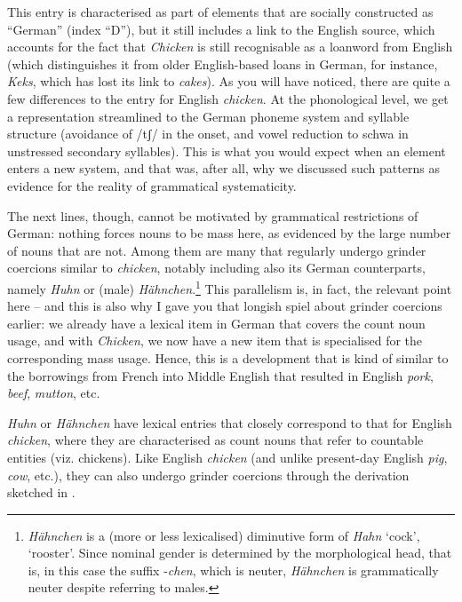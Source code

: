 This entry is characterised as part of elements that are socially constructed as “German” (index “D”), but it still includes a link to the English source, which accounts for the fact that \textit{Chicken} is still recognisable as a loanword from English (which distinguishes it from older English-based loans in German, for instance, \textit{Keks}, which has lost its link to \textit{cakes}). As you will have noticed, there are quite a few differences to the entry for English \textit{chicken}. At the phonological level, we get a representation streamlined to the German phoneme system and syllable structure (avoidance of /tʃ/ in the onset, and vowel reduction to schwa in unstressed secondary syllables). This is what you would expect when an element enters a new system, and that was, after all, why we discussed such patterns as evidence for the reality of grammatical systematicity.

The next lines, though, cannot be motivated by grammatical restrictions of German: nothing forces nouns to be mass here, as evidenced by the large number of nouns that are not. Among them are many that regularly undergo grinder coercions similar to \textit{chicken}, notably including also its German counterparts, namely \textit{Huhn} or (male) \textit{Hähnchen}.\footnote{\textit{Hähnchen} is a (more or less lexicalised) diminutive form of \textit{Hahn} ‘cock’, ‘rooster’. Since nominal gender is determined by the morphological head, that is, in this case the suffix -\textit{chen}, which is neuter, \textit{Hähnchen} is grammatically neuter despite referring to males.} This parallelism is, in fact, the relevant point here – and this is also why I gave you that longish spiel about grinder coercions earlier: we already have a lexical item in German that covers the count noun usage, and with \textit{Chicken}, we now have a new item that is specialised for the corresponding mass usage. Hence, this is a development that is kind of similar to the borrowings from French into Middle English that resulted in English \textit{pork}, \textit{beef}, \textit{mutton}, etc.

\textit{Huhn} or \textit{Hähnchen} have lexical entries that closely correspond to that for English \textit{chicken}, where they are characterised as count nouns that refer to countable entities (viz. chickens). Like English \textit{chicken} (and unlike present-day English \textit{pig}, \textit{cow}, etc.), they can also undergo grinder coercions through the derivation sketched in .

